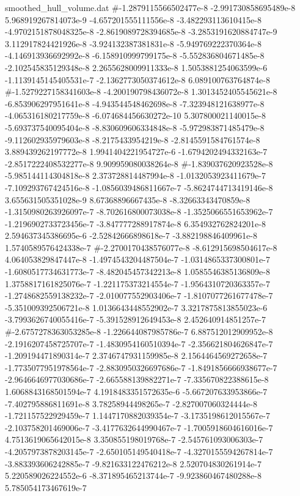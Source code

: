 \begin{filecontents}{smoothed_hull_volume.dat}
#-1.2879115566502477e-8	-2.991730858695489e-8	5.968919267814073e-9	-4.657201555111556e-8	-3.482293113610415e-8	-4.9702151878048325e-8	-2.8619089728394685e-8	-3.2853191620884747e-9	3.112917824421926e-8	-3.924132387381831e-8	-5.949769222370364e-8	-4.146913936692992e-8	-6.158910999799175e-8	-5.552836804671485e-8	-2.102545835129348e-8	2.2655628009911333e-8	1.5053881254063599e-6	-1.1139145145405531e-7	-2.1362773050374612e-8	6.089100763764874e-8
#-1.5279227158341603e-8	-4.200190798436072e-8	1.3013452405545621e-8	-6.853906297951641e-8	-4.943544548462698e-8	-7.323948121638977e-8	-4.065316180217759e-8	-6.074684456630272e-10	5.307800021140015e-8	-5.693737540095404e-8	-8.830609606334848e-8	-5.972983871485479e-8	-9.112602935979603e-8	-8.2175433954219e-8	-2.8145591584761574e-8	3.889439262197772e-8	1.9941404221954727e-6	-1.6794202494332163e-7	-2.8517222408532277e-8	9.909959080038264e-8
#-1.839037620923528e-8	-5.985144114304818e-8	2.373728814487994e-8	-1.0132053923411679e-7	-7.109293767424516e-8	-1.0856039486811667e-7	-5.8624744713419146e-8	3.655631505351028e-9	8.67368896667435e-8	-8.32663343470859e-8	-1.3150980263926097e-7	-8.702616800073038e-8	-1.3525066551653962e-7	-1.2196902733723456e-7	-3.847777288917874e-8	6.354932762824201e-8	2.594637345386695e-6	-2.52842666898618e-7	-3.882198846409961e-8	1.5740589576424338e-7
#-2.2700170438576077e-8	-8.612915698504617e-8	4.064053829847447e-8	-1.4974543204487504e-7	-1.0314865337300801e-7	-1.6080517734631773e-7	-8.482045457342213e-8	1.0585546385136809e-8	1.3758817161825076e-7	-1.221175373214554e-7	-1.9564310720363357e-7	-1.2748682559138232e-7	-2.010077552903406e-7	-1.8107077261677478e-7	-5.351009392506721e-8	1.0136643448552902e-7	3.3217875813855023e-6	-3.7993626740055416e-7	-5.391528912649453e-8	2.452640914851257e-7
#-2.6757278363053285e-8	-1.226644087985786e-7	6.887512012909952e-8	-2.1916207458725707e-7	-1.4830954160510394e-7	-2.356621804626847e-7	-1.209194471890314e-7	2.3746747931159985e-8	2.1564464569272658e-7	-1.7735077951978564e-7	-2.8830950326697686e-7	-1.8491856666938677e-7	-2.9646646977030686e-7	-2.665588139882271e-7	-7.335670822388615e-8	1.6068843168501594e-7	4.1918483351572635e-6	-5.667207633953866e-7	-7.402795886811691e-8	3.78258944498265e-7
-2.827007060324444e-8	-1.721157522929459e-7	1.1447170882039354e-7	-3.1735198612015567e-7	-2.103758201469006e-7	-3.4177632644990467e-7	-1.7005918604616016e-7	4.7513619065642015e-8	3.350855198019768e-7	-2.545761093006303e-7	-4.2057973878203145e-7	-2.650105149540418e-7	-4.3270155594267814e-7	-3.883393606242885e-7	-9.821633122476212e-8	2.520704830261914e-7	5.220589026224552e-6	-8.371895465213744e-7	-9.923860467480288e-8	5.785054173467619e-7

\end{filecontents}
